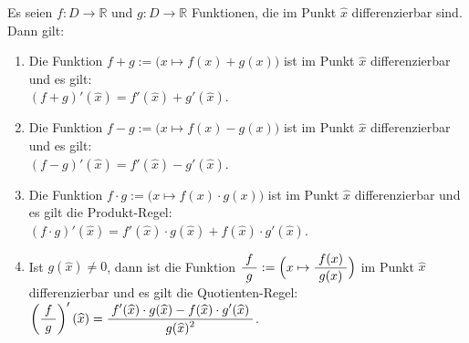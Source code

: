 \begin{Satz}
Es seien $f: D \rightarrow \mathbb{R}$  und $g: D \rightarrow \mathbb{R}$ Funktionen, die
im Punkt $\widehat{x}$ differenzierbar sind. Dann gilt:
\begin{enumerate}
\item Die Funktion $f + g := \bigl(x \mapsto f(x) + g(x)\bigr)$ ist im Punkt $\widehat{x}$
      differenzierbar und es gilt:
      \\[0.3cm]
      \hspace*{1.3cm} $(f+ g)'(\widehat{x}) = f'(\widehat{x}) + g'(\widehat{x})$.
\item Die Funktion $f - g := \bigl(x \mapsto f(x) - g(x)\bigr)$ ist im Punkt $\widehat{x}$
      differenzierbar und es gilt:
      \\[0.3cm]
      \hspace*{1.3cm} $(f - g)'(\widehat{x}) = f'(\widehat{x}) - g'(\widehat{x})$.
\item Die Funktion $f \cdot g := \bigl(x \mapsto f(x) \cdot g(x)\bigr)$ ist im Punkt $\widehat{x}$
      differenzierbar und es gilt die Produkt-Regel:
      \\[0.3cm]
      \hspace*{1.3cm} $(f \cdot g)'(\widehat{x}) = f'(\widehat{x})\cdot g(\widehat{x}) + f(\widehat{x})\cdot g'(\widehat{x})$.
\item Ist $g(\widehat{x}) \not= 0$, dann ist
      die Funktion $\displaystyle\frac{\;\displaystyle f\;}{\;\displaystyle g\;} := \Bigl(x \mapsto \displaystyle\frac{\;\displaystyle f(x)\;}{\;\displaystyle g(x)\;}\Bigr)$ im Punkt $\widehat{x}$
      differenzierbar und es gilt die Quotienten-Regel:
      \\[0.3cm]
      \hspace*{1.3cm} $\left(\displaystyle\frac{\;\displaystyle f\;}{\;\displaystyle g\;}\right)'(\widehat{x}) = \displaystyle\frac{\;\displaystyle f'(\widehat{x})\cdot g(\widehat{x}) - f(\widehat{x})\cdot g'(\widehat{x})\;}{\;\displaystyle g(\widehat{x})^2\;}$.
\end{enumerate}
\end{Satz}

